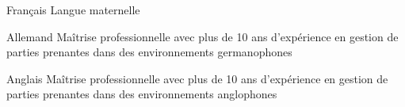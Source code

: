 

\begin{cvskills}
  \cvskill
    {Français} %
    {Langue maternelle} %

  \cvskill
    {Allemand} %
    {Maîtrise professionnelle avec plus de 10 ans d'expérience en gestion de parties prenantes dans des environnements germanophones} %

  \cvskill
    {Anglais} %
    {Maîtrise professionnelle avec plus de 10 ans d'expérience en gestion de parties prenantes dans des environnements anglophones} %

\end{cvskills}
